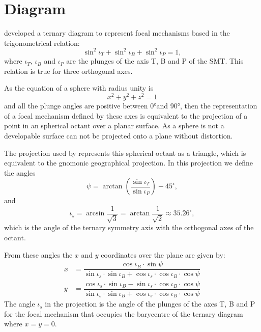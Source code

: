 \documentclass[11pt,a4paper,english]{article}
\numberwithin{equation}{section}
\begin{document}
\section{Diagram}
\label{sec:diagram}

\citet{froh92} developed a ternary diagram to represent focal mechanisms
based in the trigonometrical relation: 
\begin{equation}
\sin^{2}\iota_{T}+\sin^{2}\iota_{B}+\sin^{2}\iota_{P}=1,
\end{equation}
where $\iota_{T}$, $\iota_{B}$ and $\iota_{P}$ are the plunges
of the axis T, B and P of the SMT. This relation is true for three
orthogonal axes.

As the equation of a sphere with radius unity is 
\begin{equation}
x^{2}+y^{2}+z^{2}=1
\end{equation}
and all the plunge angles are positive between 0°and 90°, then the
representation of a focal mechanism defined by these axes is equivalent
to the projection of a point in an spherical octant over a planar
surface. As a sphere is not a developable surface can not be projected
onto a plane without distortion.

The projection used by \citet{froh92} represents this spherical octant
as a triangle, which is equivalent to the gnomonic geographical projection.
In this projection we define the angles 
\begin{equation}
\psi=\arctan\left(\dfrac{\sin\iota_{T}}{\sin\iota_{P}}\right)-45^{\circ},
\end{equation}
and 
\begin{equation}
\iota_{s}=\arcsin\dfrac{1}{\sqrt{3}}=\arctan\dfrac{1}{\sqrt{2}}\approx35.26^{\circ},
\end{equation}
which is the angle of the ternary symmetry axis with the orthogonal
axes of the octant.

From these angles the $x$ and $y$ coordinates over the plane are
given by: 
\begin{align}
x&=\dfrac{\cos\iota_{B}\cdot\sin\psi}{\sin\iota_{s}\cdot\sin\iota_{B}+\cos\iota_{s}\cdot\cos\iota_{B}\cdot\cos\psi}\\
y&=\dfrac{\cos\iota_{s}\cdot\sin\iota_{B}-\sin\iota_{s}\cdot\cos\iota_{B}\cdot\cos\psi}{\sin\iota_{s}\cdot\sin\iota_{B}+\cos\iota_{s}\cdot\cos\iota_{B}\cdot\cos\psi}
\end{align}
The angle $\iota_{s}$ in the projection is the angle of the plunges
of the axes T, B and P for the focal mechanism that occupies the barycentre
of the ternary diagram where $x=y=0$.
\end{document}
